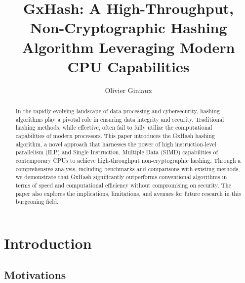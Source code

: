 \documentclass[10pt]{article}
\title{GxHash: A High-Throughput, Non-Cryptographic Hashing Algorithm Leveraging Modern CPU Capabilities}
\author{Olivier Giniaux}
\date{}
\begin{document}
\maketitle

\begin{abstract}

In the rapidly evolving landscape of data processing and cybersecurity, hashing algorithms play a pivotal role in ensuring data integrity and security.
Traditional hashing methods, while effective, often fail to fully utilize the computational capabilities of modern processors.
This paper introduces the GxHash hashing algorithm, a novel approach that harnesses the power of high instruction-level parallelism (ILP) and Single Instruction, Multiple Data (SIMD) capabilities of contemporary CPUs to achieve high-throughput non-cryptographic hashing. Through a comprehensive analysis, including benchmarks and comparisons with existing methods, we demonstrate that GxHash significantly outperforms conventional algorithms in terms of speed and computational efficiency without compromising on security. The paper also explores the implications, limitations, and avenues for future research in this burgeoning field.

\end{abstract}

\begin{multicols}{2}
\tableofcontents
\end{multicols}

\clearpage
\section{Introduction}

\subsection{Motivations}
\end{document}
